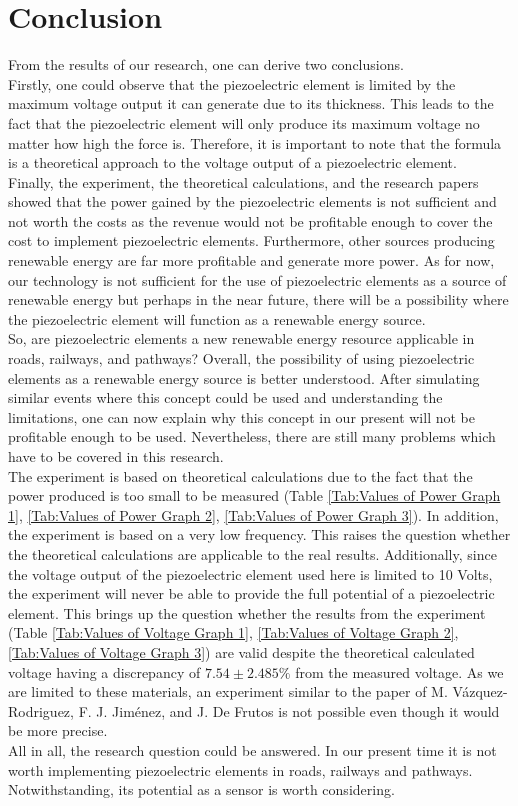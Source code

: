 \section{Conclusion}

From the results of our research, one can derive two conclusions.\\
Firstly, one could observe that the piezoelectric element is limited by the maximum voltage output it can generate due to its thickness. This leads to the fact that the piezoelectric element will only produce its maximum voltage no matter how high the force is. Therefore, it is important to note that the formula is a theoretical approach to the voltage output of a piezoelectric element.\\
Finally, the experiment, the theoretical calculations, and the research papers showed that the power gained by the piezoelectric elements is not sufficient and not worth the costs as the revenue would not be profitable enough to cover the cost to implement piezoelectric elements. Furthermore, other sources producing renewable energy are far more profitable and generate more power. As for now, our technology is not sufficient for the use of piezoelectric elements as a source of renewable energy but perhaps in the near future, there will be a possibility where the piezoelectric element will function as a renewable energy source.\\
So, are piezoelectric elements a new renewable energy resource applicable in roads, railways, and pathways? Overall, the possibility of using piezoelectric elements as a renewable energy source is better understood. After simulating similar events where this concept could be used and understanding the limitations, one can now explain why this concept in our present will not be profitable enough to be used. Nevertheless, there are still many problems which have to be covered in this research.\\
The experiment is based on theoretical calculations due to the fact that the power produced is too small to be measured (Table \ref{Tab:Values of Power Graph 1}, \ref{Tab:Values of Power Graph 2}, \ref{Tab:Values of Power Graph 3}). In addition, the experiment is based on a very low frequency. This raises the question whether the theoretical calculations are applicable to the real results. Additionally, since the voltage output of the piezoelectric element used here is limited to 10 Volts, the experiment will never be able to provide the full potential of a piezoelectric element. This brings up the question whether the results from the experiment (Table \ref{Tab:Values of Voltage Graph 1}, \ref{Tab:Values of Voltage Graph 2}, \ref{Tab:Values of Voltage Graph 3}) are valid despite the theoretical calculated voltage having a discrepancy of $7.54 \pm 2.485 \%$ from the measured voltage. As we are limited to these materials, an experiment similar to the paper of M. Vázquez-Rodriguez, F. J. Jiménez, and J. De Frutos is not possible even though it would be more precise.\\
All in all, the research question could be answered. In our present time it is not worth implementing piezoelectric elements in roads, railways and pathways. Notwithstanding, its potential as a sensor is worth considering.